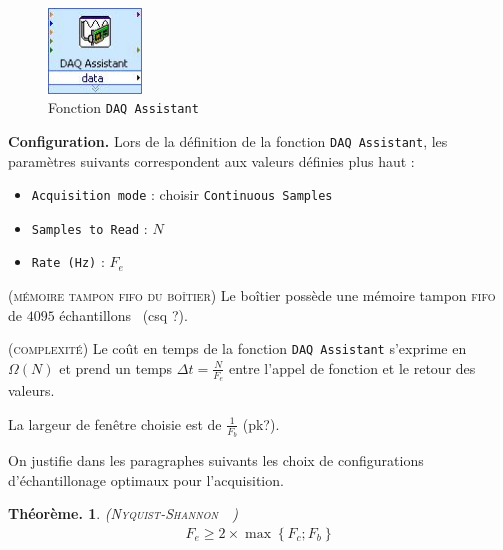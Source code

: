 \documentclass[twocolumn,pre,floats,aps,amsmath,amssymb]{revtex4}
\newtheorem{theorem}{Th\'eor\`eme.}[section]
\newenvironment{notation}[1][Notation.]{\begin{trivlist}
\item[\hskip \labelsep {\bfseries #1}]}{\end{trivlist}}
\newenvironment{remark}[1][Remarque.]{\begin{trivlist}
\item[\hskip \labelsep {\bfseries #1}]}{\end{trivlist}}
\begin{document}

\begin{figure}[h]
  \includegraphics[width=2.5cm]{pictures/DAQ_Assistant.png}
\caption{Fonction \texttt{DAQ Assistant}}
\label{fig:NI_DAQ_Assitant}
\end{figure}

\noindent
\textbf{Configuration.} Lors de la d\'efinition de la fonction \texttt{DAQ Assistant}, les param\`etres suivants correspondent aux valeurs d\'efinies plus haut :
\begin{itemize}
  \item{\texttt{Acquisition mode} : choisir \texttt{Continuous Samples}}~\cite{NI_continuous_samp}
  \item{\texttt{Samples to Read} : $N$}
  \item{\texttt{Rate (Hz)} : $F_e$}
\end{itemize}

\begin{remark}
  (\textsc{m\'emoire tampon fifo du bo\^itier})
  Le bo\^itier poss\`ede une m\'emoire tampon \textsc{fifo} de $4095$ \'echantillons~\cite{NI_6353_datasheet} (csq ?).
\end{remark}

\begin{remark}
  \textsc{(complexit\'e)}
  Le co\^ut en temps de la fonction \texttt{DAQ Assistant} s'exprime en $\Omega(N)$\cite{omega} et prend un temps $\Delta t = \frac{N}{F_e}$ entre l'appel de fonction et le retour des valeurs.
\end{remark}

La largeur de fen\^etre choisie est de $\frac{1}{F_b}$ (pk?).

On justifie dans les paragraphes suivants les choix de configurations d'\'echantillonage optimaux pour l'acquisition.

\begin{theorem} (\textsc{Nyquist-Shannon}~\cite{Nyquist}~\cite{Shannon})
  \begin{eqnarray}
    F_e \geq 2 \times \operatorname{max} \left \{ F_c ; F_b \right \}
  \end{eqnarray}
\end{theorem}
\end{document}
